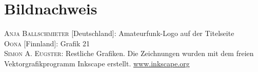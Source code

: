 \chapter{Bildnachweis}
\noindent
\textsc{Anja Ballschmieter} [Deutschland]: Amateurfunk-Logo auf der Titelseite\\
\textsc{Oona} [Finnland]: Grafik 21\\
\textsc{Simon A. Eugster}: Restliche Grafiken. Die Zeichnungen wurden mit dem freien Vektorgrafikprogramm Inkscape erstellt. \href{http://www.inkscape.org}{www.inkscape.org}